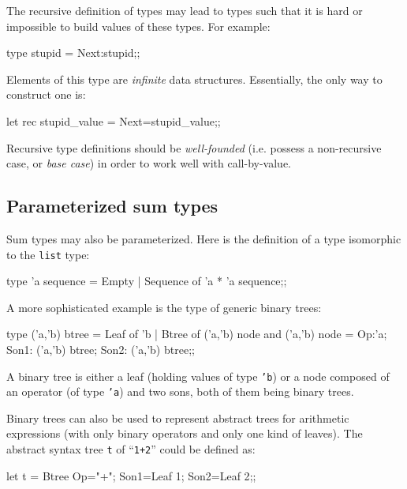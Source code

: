 The recursive definition of types may lead to types such that it is
hard or impossible to build values of these types.
For example:
\begin{caml_example}
type stupid = {Next:stupid};;
\end{caml_example}
Elements of this type are {\em infinite} data structures. Essentially,
the only way to construct one is:
\begin{caml_example}
let rec stupid_value = {Next=stupid_value};;
\end{caml_example}

Recursive type definitions should be {\em well-founded} (i.e. possess
a non-recursive case, or {\em base case}) in order to work well with
call-by-value.

\subsection{Parameterized sum types}

Sum types may also be parameterized.
Here is the definition of a type isomorphic to the {\tt list} type:
\begin{caml_example}
type 'a sequence = Empty
                 | Sequence of 'a * 'a sequence;;
\end{caml_example}

A more sophisticated example is the type of generic binary trees:
\begin{caml_example}
type ('a,'b) btree = Leaf of 'b
                   | Btree of ('a,'b) node
and ('a,'b) node = {Op:'a;
                    Son1: ('a,'b) btree;
                    Son2: ('a,'b) btree};;
\end{caml_example}
A binary tree is either a leaf (holding values of type {\tt 'b}) or a
node composed of an operator (of type {\tt 'a}) and two sons, both of them
being binary trees.

Binary trees can also be used to represent abstract trees for
arithmetic expressions (with only binary operators and only one kind
of leaves). The abstract
syntax tree \verb|t| of ``\verb|1+2|'' could be defined as:
\begin{caml_example}
let t = Btree {Op="+"; Son1=Leaf 1; Son2=Leaf 2};;
\end{caml_example}

